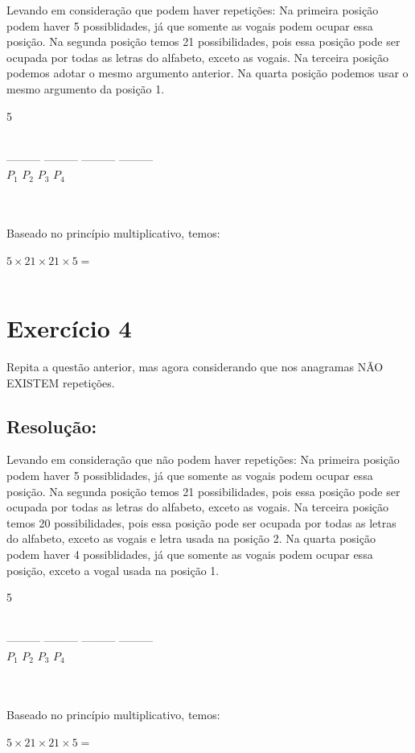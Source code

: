\documentclass[12pt,a4paper]{article}
\newcommand\tab[1][1cm]{\hspace*{#1}}
\begin{document}
\tab Levando em consideração que podem haver repetições: Na primeira posição podem haver 5 possiblidades, já que somente as vogais podem ocupar essa posição. Na segunda posição temos 21 possibilidades, pois essa posição pode ser ocupada por todas as letras do alfabeto, exceto as vogais. Na terceira posição podemos adotar o mesmo argumento anterior. Na quarta posição podemos usar o mesmo argumento da posição 1.
\\
\begin{center}
5   \\\

    ---------   ---------  ---------   ---------\\
$P_{1}$ \qquad $P_{2}$ \qquad $P_{3}$ \qquad $P_{4}$\\\
\end{center}\\
Baseado no princípio multiplicativo, temos:\\\\
$5 \times 21 \times 21 \times 5=$\\\\
\newpage

\section{Exercício 4}

Repita a questão anterior, mas agora considerando que nos anagramas NÃO EXISTEM repetições.

\subsection{Resolução:}

\tab Levando em consideração que não podem haver repetições: Na primeira posição podem haver 5 possiblidades, já que somente as vogais podem ocupar essa posição. Na segunda posição temos 21 possibilidades, pois essa posição pode ser ocupada por todas as letras do alfabeto, exceto as vogais. Na terceira posição temos 20 possibilidades, pois essa posição pode ser ocupada por todas as letras do alfabeto, exceto as vogais e letra usada na posição 2. Na quarta posição podem haver 4 possiblidades, já que somente as vogais podem ocupar essa posição, exceto a vogal usada na posição 1.
\\
\begin{center}
5   \\\

    ---------   ---------  ---------   ---------\\
$P_{1}$ \qquad $P_{2}$ \qquad $P_{3}$ \qquad $P_{4}$\\\
\end{center}\\
Baseado no princípio multiplicativo, temos:\\\\
$5 \times 21 \times 21 \times 5=$\\\\
\fcolorbox{black}{green}{\Large $8.400$}
\newpage
\end{document}
